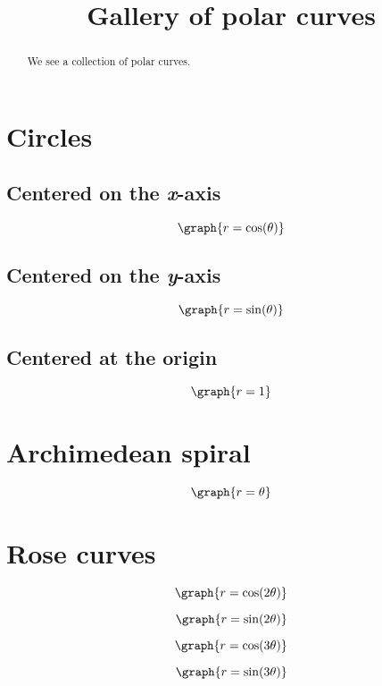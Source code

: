 \documentclass{ximera}
\title[Dig-In:]{Gallery of polar curves}
\begin{document}
\begin{abstract}
We see a collection of polar curves.
\end{abstract}
\maketitle

\section{Circles}

\subsection{Centered on the \textit{x}-axis}
\[
\graph{r=\cos(\theta)}
\]

\subsection{Centered on the \textit{y}-axis}
\[
\graph{r=\sin(\theta)}
\]

\subsection{Centered at the origin}
\[
\graph{r=1}
\]

\section{Archimedean spiral}
\[
\graph{r=\theta}
\]

\section{Rose curves}

\[
\graph{r=\cos(2\theta)}
\]

\[
\graph{r=\sin(2\theta)}
\]

\[
\graph{r=\cos(3\theta)}
\]

\[
\graph{r=\sin(3\theta)}
\]
\end{document}
